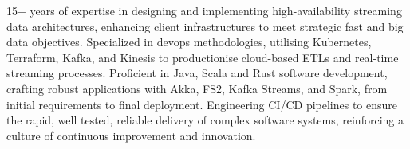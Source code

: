 

\begin{cvparagraph}

15+ years of expertise in designing and implementing high-availability streaming data architectures, enhancing client infrastructures to meet strategic fast and big data objectives.
Specialized in devops methodologies, utilising Kubernetes, Terraform, Kafka, and Kinesis to productionise cloud-based ETLs and real-time streaming processes.
Proficient in Java, Scala and Rust software development, crafting robust applications with Akka, FS2, Kafka Streams, and Spark, from initial requirements to final deployment.
Engineering CI/CD pipelines to ensure the rapid, well tested, reliable delivery of complex software systems, reinforcing a culture of continuous improvement and innovation.
\end{cvparagraph}
